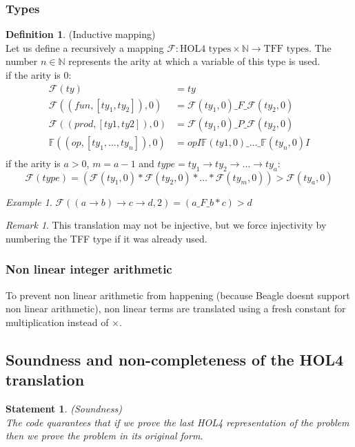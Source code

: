 \documentclass[a4paper, 11pt]{article}
\theoremstyle{plain}
\newtheorem*{stat}{Statement}
\theoremstyle{definition}
\newtheorem*{mydef}{Definition}
\theoremstyle{remark}
\newtheorem*{remark}{Remark}
\newtheorem*{example}{Example}
\begin{document}
\subsubsection{Types}
\begin{mydef} (Inductive mapping)
\\Let us define a recursively a mapping $\mathcal{F} : \mbox{HOL4 types} \times \mathbb{N} \rightarrow \mbox{TFF types}$. The number $n\in \mathbb{N}$ represents the arity at which a variable of this type is used.
\\if the arity is $0$:
\[\begin{aligned}
\mathcal{F}(ty) &= ty\\
\mathcal{F}((fun,[ty_1,ty_2]),0) &= 
  \mathcal{F}(ty_1,0)\_F\_\mathcal{F}(ty_2,0)\\
\mathcal{F}((prod,[ty1,ty2]),0) &= 
   \mathcal{F}(ty_1,0)\_P\_\mathcal{F}(ty_2,0)\\
 \mathbb{F}((op,[ty_1,\ldots,ty_n]),0) &= 
   opI\mathbb{F}(ty1,0)\_\ldots\_\mathbb{F}(ty_n,0)I\\
\end{aligned}\]
if the arity is $a > 0$, $m = a-1$ and 
$type = ty_1 \rightarrow ty_2 \rightarrow \ldots \rightarrow ty_a$:
\[\mathcal{F}(type) = (\mathcal{F}(ty_1,0) * \mathcal{F}(ty_2,0) * \ldots * \mathcal{F}(ty_m,0)) > \mathcal{F}(ty_a,0) \]
\end{mydef}

\begin{example}
$\mathcal{F}( (a \rightarrow b) \rightarrow c \rightarrow d,2) = (a\_F\_b * c) > d$
\end{example}

\begin{remark} 
This translation may not be injective, but we force injectivity by numbering the TFF type if it was already used.
\end{remark}

\subsubsection{Non linear integer arithmetic}
To prevent non linear arithmetic from happening (because Beagle doesnt support non linear arithmetic), non linear terms are translated using a fresh constant for multiplication instead of $\times$.

\subsection{Soundness and non-completeness of the HOL4 translation}
\begin{stat} (Soundness) 
\\The code quarantees that if we prove the last HOL4 representation of the problem then we prove the problem in its original form.
\end{stat}
\end{document}
